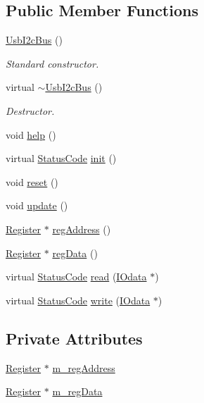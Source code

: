 \subsection*{Public Member Functions}
\begin{DoxyCompactItemize}
\item 
\hyperlink{classUsbI2cBus_aaad209bcbfd0bcf9fac020100677e723}{Usb\+I2c\+Bus} ()
\begin{DoxyCompactList}\small\item\em Standard constructor. \end{DoxyCompactList}\item 
virtual \hyperlink{classUsbI2cBus_a6428f1ac620fa3b0b9e98354e1d3f41a}{$\sim$\+Usb\+I2c\+Bus} ()
\begin{DoxyCompactList}\small\item\em Destructor. \end{DoxyCompactList}\item 
void \hyperlink{classUsbI2cBus_a5c3349f89fff94a8eae3d9752f5fcf6a}{help} ()
\item 
virtual \hyperlink{classStatusCode}{Status\+Code} \hyperlink{classUsbI2cBus_a595c6e7f618e4f8c6b45e2dcf0fbdabb}{init} ()
\item 
void \hyperlink{classUsbI2cBus_a4063433fd349fff112f4e2ceb3d35072}{reset} ()
\item 
void \hyperlink{classUsbI2cBus_a40bd44e6fe19f3e9c52bd4b4e14b80a9}{update} ()
\item 
\hyperlink{classRegister}{Register} $\ast$ \hyperlink{classUsbI2cBus_a3fb938828d8d0592076ad8cf5821b35b}{reg\+Address} ()
\item 
\hyperlink{classRegister}{Register} $\ast$ \hyperlink{classUsbI2cBus_adbd9f85503b361a5b170df2c6c1e733b}{reg\+Data} ()
\item 
virtual \hyperlink{classStatusCode}{Status\+Code} \hyperlink{classUsbI2cBus_a142e9ab303f5e36f5ac4b4dd46d9b375}{read} (\hyperlink{classIOdata}{I\+Odata} $\ast$)
\item 
virtual \hyperlink{classStatusCode}{Status\+Code} \hyperlink{classUsbI2cBus_a3f94dd5ab9594a1f69be7869c41c8bc8}{write} (\hyperlink{classIOdata}{I\+Odata} $\ast$)
\end{DoxyCompactItemize}
\subsection*{Private Attributes}
\begin{DoxyCompactItemize}
\item 
\hyperlink{classRegister}{Register} $\ast$ \hyperlink{classUsbI2cBus_ad109ed1599f94c84fb4469be8f0d174e}{m\+\_\+reg\+Address}
\item 
\hyperlink{classRegister}{Register} $\ast$ \hyperlink{classUsbI2cBus_afce60d99fce3a99d0d7d59d43a2f7ba5}{m\+\_\+reg\+Data}
\end{DoxyCompactItemize}
